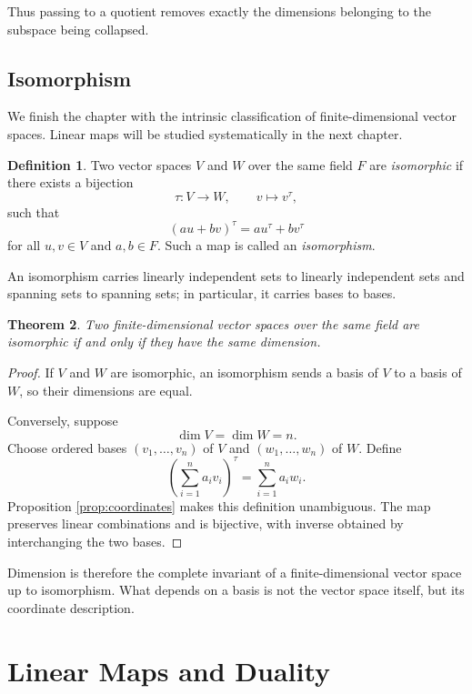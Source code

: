 \documentclass{amsbook}
\newtheorem{theorem}{Theorem}[chapter]
\theoremstyle{definition}
\newtheorem{definition}[theorem]{Definition}
\theoremstyle{remark}
\numberwithin{section}{chapter}
\numberwithin{equation}{chapter}
\begin{document}
Thus passing to a quotient removes exactly the dimensions belonging to the subspace being collapsed.

\section{Isomorphism}

We finish the chapter with the intrinsic classification of finite-dimensional vector spaces. Linear maps will be studied systematically in the next chapter.

\begin{definition}
	Two vector spaces $V$ and $W$ over the same field $F$ are \emph{isomorphic} if there exists a bijection
	\[
	\tau\colon V\longrightarrow W,\qquad v\longmapsto v^\tau,
	\]
	such that
	\[
	(au+bv)^\tau=au^\tau+bv^\tau
	\]
	for all $u,v\in V$ and $a,b\in F$. Such a map is called an \emph{isomorphism}.
\end{definition}

An isomorphism carries linearly independent sets to linearly independent sets and spanning sets to spanning sets; in particular, it carries bases to bases.

\begin{theorem}\label{thm:dimension-classification}
	Two finite-dimensional vector spaces over the same field are isomorphic if and only if they have the same dimension.
\end{theorem}

\begin{proof}
	If $V$ and $W$ are isomorphic, an isomorphism sends a basis of $V$ to a basis of $W$, so their dimensions are equal.

	Conversely, suppose
	\[
	\dim V=\dim W=n.
	\]
	Choose ordered bases $(v_1,\dots,v_n)$ of $V$ and $(w_1,\dots,w_n)$ of $W$. Define
	\[
	\left(\sum_{i=1}^n a_iv_i\right)^\tau
	=
	\sum_{i=1}^n a_iw_i.
	\]
	Proposition \ref{prop:coordinates} makes this definition unambiguous. The map preserves linear combinations and is bijective, with inverse obtained by interchanging the two bases.
\end{proof}

Dimension is therefore the complete invariant of a finite-dimensional vector space up to isomorphism. What depends on a basis is not the vector space itself, but its coordinate description.

\chapter{Linear Maps and Duality}
\end{document}
